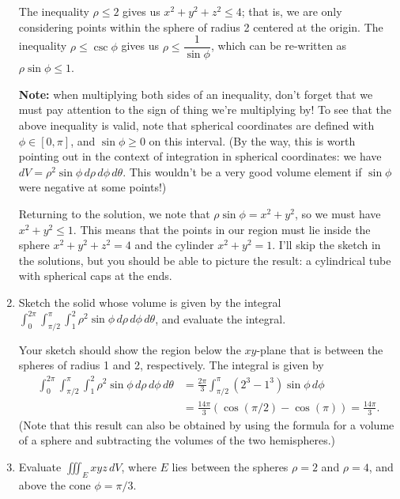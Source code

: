 \documentclass[letterpaper,12pt]{article}
\newcommand{\di}{\displaystyle}
\begin{document}
\begin{enumerate}
\bigskip

The inequality $\rho\leq 2$ gives us $x^2+y^2+z^2\leq 4$; that is, we are only considering points within the sphere of radius 2 centered at the origin. The inequality $\rho \leq \csc\phi$ gives us $\rho\leq\dfrac{1}{\sin\phi}$, which can be re-written as $\rho\sin\phi\leq 1$.

\medskip

{\bf Note:} when multiplying both sides of an inequality, don't forget that we must pay attention to the sign of thing we're multiplying by! To see that the above inequality is valid, note that spherical coordinates are defined with $\phi\in [0,\pi]$, and $\sin \phi\geq 0$ on this interval. (By the way, this is worth pointing out in the context of integration in spherical coordinates: we have $dV = \rho^2\sin\phi\, d\rho\, d\phi\, d\theta$. This wouldn't be a very good volume element if $\sin\phi$ were negative at some points!)

\medskip

Returning to the solution, we note that $\rho\sin\phi = x^2+y^2$, so we must have $x^2+y^2\leq 1$. This means that the points in our region must lie inside the sphere $x^2+y^2+z^2=4$ and the cylinder $x^2+y^2=1$. I'll skip the sketch in the solutions, but you should be able to picture the result: a cylindrical tube with spherical caps at the ends.

\bigskip



\item  Sketch the solid whose volume is given by the integral $\di \int_0^{2\pi}\int_{\pi/2}^\pi\int_1^2\rho^2\sin\phi\, d\rho\, d\phi\, d\theta$, and evaluate the integral.

\bigskip

Your sketch should show the region below the $xy$-plane that is between the spheres of radius 1 and 2, respectively. The integral is given by
\begin{align*}
 \int_0^{2\pi}\int_{\pi/2}^\pi\int_1^2\rho^2\sin\phi\, d\rho\, d\phi\, d\theta & = \frac{2\pi}{3}\int_{\pi/2}^\pi\left(2^3-1^3\right)\sin\phi\,d\phi\\
 & = \frac{14\pi}{3}\left(\cos(\pi/2)-\cos(\pi)\right) = \frac{14\pi}{3}.
\end{align*}
(Note that this result can also be obtained by using the formula for a volume of a sphere and subtracting the volumes of the two hemispheres.)

\bigskip


\item  Evaluate $\iiint_E xyz\, dV$, where $E$ lies between the spheres $\rho =2$ and $\rho = 4$, and above the cone $\phi = \pi/3$.



\end{enumerate}
\end{document}
